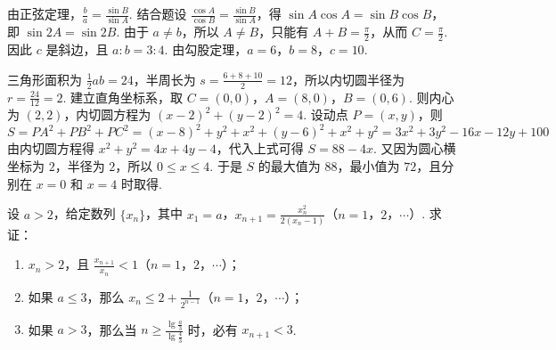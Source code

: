 \begin{solution}
由正弦定理，\(\frac{b}{a}=\frac{\sin B}{\sin A}\). 结合题设 \(\frac{\cos A}{\cos B}=\frac{\sin B}{\sin A}\)，得 \(\sin A\cos A=\sin B\cos B\)，即 \(\sin2A=\sin2B\). 由于 \(a\neq b\)，所以 \(A\neq B\)，只能有 \(A+B=\frac\pi2\)，从而 \(C=\frac\pi2\). 因此 \(c\) 是斜边，且 \(a:b=3:4\). 由勾股定理，\(a=6\)，\(b=8\)，\(c=10\).

三角形面积为 \(\frac12ab=24\)，半周长为 \(s=\frac{6+8+10}{2}=12\)，所以内切圆半径为 \(r=\frac{24}{12}=2\). 建立直角坐标系，取 \(C=(0,0)\)，\(A=(8,0)\)，\(B=(0,6)\). 则内心为 \((2,2)\)，内切圆方程为 \((x-2)^2+(y-2)^2=4\). 设动点 \(P=(x,y)\)，则
\[
S=PA^2+PB^2+PC^2=(x-8)^2+y^2+x^2+(y-6)^2+x^2+y^2=3x^2+3y^2-16x-12y+100
\]
由内切圆方程得 \(x^2+y^2=4x+4y-4\)，代入上式可得 \(S=88-4x\). 又因为圆心横坐标为 \(2\)，半径为 \(2\)，所以 \(0\leqslant x\leqslant4\). 于是 \(S\) 的最大值为 \(88\)，最小值为 \(72\)，且分别在 \(x=0\) 和 \(x=4\) 时取得.
\end{solution}

\begin{problem}

设 \(a > 2\)，给定数列 \(\{x_n\}\)，其中 \(x_1 = a\)，\(x_{n+1} = \frac{x_n^2}{2(x_n - 1)}\)（\(n = 1\)，\(2\)，\(\cdots\)）. 求证：

\begin{enumerate}
\item \(x_n > 2\)，且 \(\frac{x_{n + 1}}{x_n} < 1\)（\(n = 1\)，\(2\)，\(\cdots\)）；
\item 如果 \(a \leqslant 3\)，那么 \(x_n \leqslant 2 + \frac{1}{2^{n - 1}}\)（\(n = 1\)，\(2\)，\(\cdots\)）；
\item 如果 \(a > 3\)，那么当 \(n \geqslant \frac{\lg \frac{a}{3}}{\lg \frac{4}{3}}\) 时，必有 \(x_{n + 1} < 3\).
\end{enumerate}
\end{problem}

